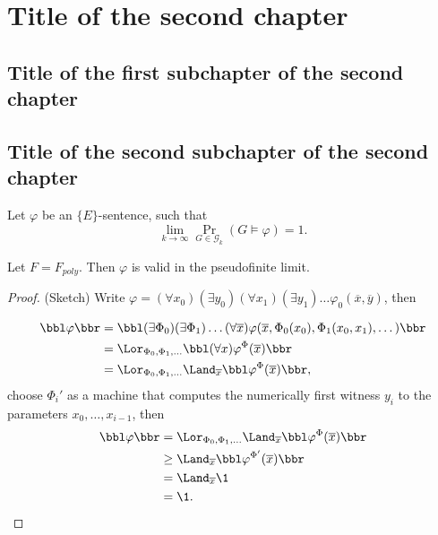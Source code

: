 \chapter{Title of the second chapter}

\section{Title of the first subchapter of the second chapter}

\section{Title of the second subchapter of the second chapter}
\begin{thrm}
Let $\varphi$ be an $\{E\}$-sentence, such that 
\[\lim_{k\to\infty}\Pr_{G\in\mathcal{G}_k}(G\models\varphi)=1.\]

Let $F=F_{poly}$. Then $\varphi$ is valid in the pseudofinite limit.
\end{thrm}
\begin{proof}(Sketch) Write $\varphi=(\forall x_0)(\exists y_0)(\forall x_1)(\exists y_1)\dots\varphi_0(\overline x,\overline y)$, then 

\begin{align}
\bbl\varphi\bbr&=\bbl(\exists\Phi_0)(\exists\Phi_1)\dots(\forall \overline x)\varphi(\overline x,\Phi_0(x_0),\Phi_1(x_0,x_1),\dots)\bbr\\
&=\Lor_{\Phi_0,\Phi_1,\dots}\bbl(\forall x)\varphi^\Phi(\overline x)\bbr\\
&=\Lor_{\Phi_0,\Phi_1,\dots}\Land_{\overline x}\bbl\varphi^{\Phi}(\overline x)\bbr,
\end{align}
choose $\Phi_i'$ as a machine that computes the numerically first witness $y_i$ to the parameters $x_0,\dots,x_{i-1}$, then
\begin{align}
\bbl\varphi\bbr&=\Lor_{\Phi_0,\Phi_1,\dots}\Land_{\overline x}\bbl\varphi^{\Phi}(\overline x)\bbr\\
&\geq\Land_{\overline x}\bbl\varphi^{\Phi'}(\overline x)\bbr\\
&=\Land_{\overline x}\1\\
&=\1.
\end{align}
\end{proof}

